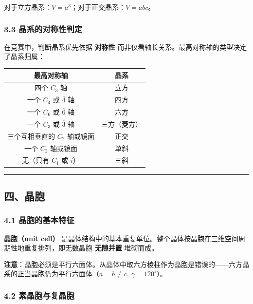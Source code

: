\documentclass[a4paper,11pt]{ctexart}
\newcounter{none}
\begin{document}
对于立方晶系：\(V = a^3\)；对于正交晶系：\(V = abc\)。

\subsubsection{3.3 晶系的对称性判定}\label{ux6676ux7cfbux7684ux5bf9ux79f0ux6027ux5224ux5b9a}

在竞赛中，判断晶系优先依据 \textbf{对称性} 而非仅看轴长关系。最高对称轴的类型决定了晶系归属：

{\def\LTcaptype{none} %
\begin{longtable}[]{@{}cc@{}}
\toprule\noalign{}
最高对称轴 & 晶系 \\
\midrule\noalign{}
\endhead
\bottomrule\noalign{}
\endlastfoot
四个 \(C_3\) 轴 & 立方 \\
一个 \(C_4\) 或 \(\overline{4}\) 轴 & 四方 \\
一个 \(C_6\) 或 \(\overline{6}\) 轴 & 六方 \\
一个 \(C_3\) 或 \(\overline{3}\) 轴 & 三方（菱方） \\
三个互相垂直的 \(C_2\) 轴或镜面 & 正交 \\
一个 \(C_2\) 轴或镜面 & 单斜 \\
无（只有 \(C_1\) 或 \(i\)） & 三斜 \\
\end{longtable}
}

\begin{center}\rule{0.5\linewidth}{0.5pt}\end{center}

\subsection{四、晶胞}\label{ux56dbux6676ux80de}

\subsubsection{4.1 晶胞的基本特征}\label{ux6676ux80deux7684ux57faux672cux7279ux5f81}

\textbf{晶胞（unit cell）} 是晶体结构中的基本重复单位。整个晶体按晶胞在三维空间周期性地重复排列，即无数晶胞 \textbf{无隙并置} 堆砌而成。

\textbf{注意}：晶胞必须是平行六面体。从晶体中取六方棱柱作为晶胞是错误的------六方晶系的正当晶胞仍为平行六面体（\(a = b \neq c,\ \gamma = 120^\circ\)）。

\subsubsection{4.2 素晶胞与复晶胞}\label{ux7d20ux6676ux80deux4e0eux590dux6676ux80de}
\end{document}
